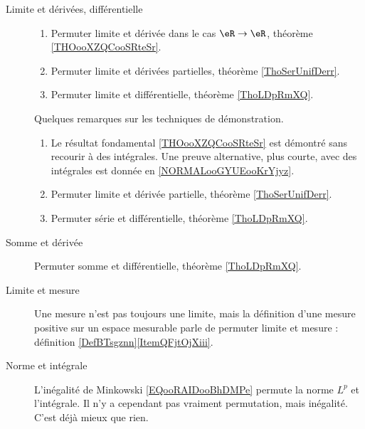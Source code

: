 \begin{description}
	\item[Limite et dérivées, différentielle]
		\begin{enumerate}
			\item
			      Permuter limite et dérivée dans le cas \( \eR\to \eR\), théorème \ref{THOooXZQCooSRteSr}.
			\item
			      Permuter limite et dérivées partielles, théorème \ref{ThoSerUnifDerr}.
			\item
			      Permuter limite et différentielle, théorème \ref{ThoLDpRmXQ}.
		\end{enumerate}
		Quelques remarques sur les techniques de démonstration.
		\begin{enumerate}
			\item
			      Le résultat fondamental \ref{THOooXZQCooSRteSr} est démontré sans recourir à des intégrales. Une preuve alternative, plus courte, avec des intégrales est donnée en \ref{NORMALooGYUEooKrYjyz}.
			\item
			      Permuter limite et dérivée partielle, théorème \ref{ThoSerUnifDerr}.
			\item
			      Permuter série et différentielle, théorème \ref{ThoLDpRmXQ}.
		\end{enumerate}
	\item[Somme et dérivée]
		Permuter somme et différentielle, théorème \ref{ThoLDpRmXQ}.
	\item[Limite et mesure]
		Une mesure n'est pas toujours une limite, mais la définition d'une mesure positive sur un espace mesurable parle de permuter limite et mesure : définition \ref{DefBTsgznn}\ref{ItemQFjtOjXiii}.
	\item[Norme et intégrale]
		L'inégalité de Minkowski \eqref{EQooRAIDooBhDMPe} permute la norme \( L^p\) et l'intégrale. Il n'y a cependant pas vraiment permutation, mais inégalité. C'est déjà mieux que rien.
\end{description}
